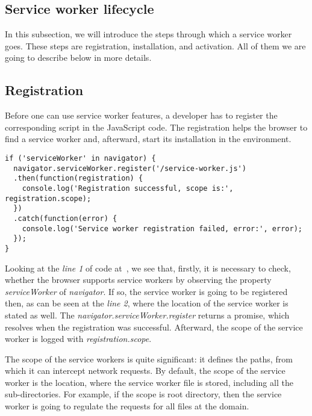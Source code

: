 \subsection{Service worker lifecycle}

In this subsection, we will introduce the steps through which a service worker goes. These steps are registration, installation, and activation. All of them we are going to describe below in more details.

\subsection*{Registration}

Before one can use service worker features, a developer has to register the corresponding script in the JavaScript code. The registration helps the browser to find a service worker and, afterward, start its installation in the environment.

\begin{lstlisting}[caption={An example code, which demonstrates how to register a service worker\cite{32}.}, label={lst:tech1}]
if ('serviceWorker' in navigator) {
  navigator.serviceWorker.register('/service-worker.js')
  .then(function(registration) {
    console.log('Registration successful, scope is:', registration.scope);
  })
  .catch(function(error) {
    console.log('Service worker registration failed, error:', error);
  });
}
\end{lstlisting}

Looking at the \textit{line 1} of code at~, we see that, firstly, it is necessary to check, whether the browser supports service workers by observing the property \textit{serviceWorker} of \textit{navigator}. If so, the service worker is going to be registered then, as can be seen at the \textit{line 2}, where the location of the service worker is stated as well. The \textit{navigator.serviceWorker.register} returns a promise, which resolves when the registration was successful. Afterward, the scope of the service worker is logged with \textit{registration.scope}. 

The scope of the service workers is quite significant: it defines the paths, from which it can intercept network requests. By default, the scope of the service worker is the location, where the service worker file is stored, including all the sub-directories. For example, if the scope is root directory, then the service worker is going to regulate the requests for all files at the domain.

